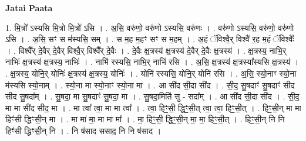 \documentclass[17pt]{extarticle}
\begin{document}
\textbf{Jatai Paata} \newline

1. मि॒त्रो᳚ ऽस्यसि मि॒त्रो मि॒त्रो॑ ऽसि । . अ॒सि॒ वरु॑णो॒ वरु॑णो ऽस्यसि॒ वरु॑णः । . वरु॑णो ऽस्यसि॒ वरु॑णो॒ वरु॑णो ऽसि । . अ॒सि॒ सꣳ स म॑स्यसि॒ सम् । . स म॒ह म॒हꣳ सꣳ स म॒हम् । . अ॒हं ॅविश्वै॒र् विश्वै॑ र॒ह म॒हं ॅविश्वैः᳚ । . विश्वै᳚र् दे॒वैर् दे॒वैर् विश्वै॒र् विश्वै᳚र् दे॒वैः । . दे॒वैः क्ष॒त्रस्य॑ क्ष॒त्रस्य॑ दे॒वैर् दे॒वैः क्ष॒त्रस्य॑ । . क्ष॒त्रस्य॒ नाभि॒र् नाभिः॑ क्ष॒त्रस्य॑ क्ष॒त्रस्य॒ नाभिः॑ । . नाभि॑ रस्यसि॒ नाभि॒र् नाभि॑ रसि । . अ॒सि॒ क्ष॒त्रस्य॑ क्ष॒त्रस्या᳚स्यसि क्ष॒त्रस्य॑ । . क्ष॒त्रस्य॒ योनि॒र् योनिः॑ क्ष॒त्रस्य॑ क्ष॒त्रस्य॒ योनिः॑ । . योनि॑ रस्यसि॒ योनि॒र् योनि॑ रसि । . अ॒सि॒ स्यो॒नाꣳ स्यो॒ना म॑स्यसि स्यो॒नाम् । . स्यो॒ना मा स्यो॒नाꣳ स्यो॒ना मा । . आ सी॑द सी॒दा सी॑द । . सी॒द॒ सु॒षदाꣳ॑ सु॒षदाꣳ॑ सीद सीद सु॒षदा᳚म् । . सु॒षदा॒ मा सु॒षदाꣳ॑ सु॒षदा॒ मा । . सु॒षदा॒मिति॑ सु - सदा᳚म् । . आ सी॑द सी॒दा सी॑द । . सी॒द॒ मा मा सी॑द सीद॒ मा । . मा त्वा᳚ त्वा॒ मा मा त्वा᳚ । . त्वा॒ हिꣳ॒॒सी॒ द्धिꣳ॒॒सी॒त् त्वा॒ त्वा॒ हिꣳ॒॒सी॒त् । . हिꣳ॒॒सी॒न् मा मा हिꣳ॑सी द्धिꣳसी॒न् मा । . मा मा॑ मा॒ मा मा मा᳚ । . मा॒ हिꣳ॒॒सी॒ द्धिꣳ॒॒सी॒न् मा॒ मा॒ हिꣳ॒॒सी॒त् । . हिꣳ॒॒सी॒न् नि नि हिꣳ॑सी द्धिꣳसी॒न् नि । . नि ष॑साद ससाद॒ नि नि ष॑साद । \newline
\end{document}
